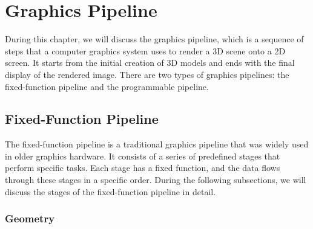 \chapter{Graphics Pipeline}

During this chapter, we will discuss the graphics pipeline, which is a sequence of steps that a computer graphics system uses to render a 3D scene onto a 2D screen. It starts from the initial creation of 3D models and ends with the final display of the rendered image. There are two types of graphics pipelines: the fixed-function pipeline and the programmable pipeline.
\section{Fixed-Function Pipeline}

The fixed-function pipeline is a traditional graphics pipeline that was widely used in older graphics hardware. It consists of a series of predefined stages that perform specific tasks. Each stage has a fixed function, and the data flows through these stages in a specific order. During the following subsections, we will discuss the stages of the fixed-function pipeline in detail.

\subsection{Geometry}


